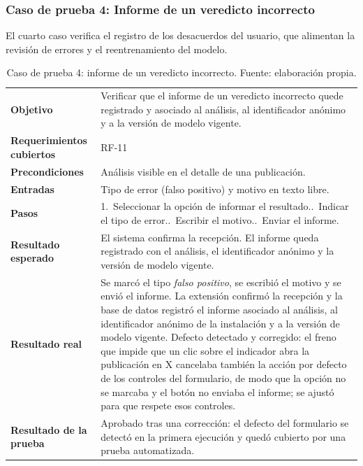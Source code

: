 \subsubsection{Caso de prueba 4: Informe de un veredicto incorrecto}

El cuarto caso verifica el registro de los desacuerdos del usuario, que alimentan la revisión de errores y el reentrenamiento del modelo.

\begin{small}
\begin{longtable}{@{}>{\raggedright\arraybackslash}p{3.4cm} p{11.8cm}@{}}
  \caption{Caso de prueba 4: informe de un veredicto incorrecto. Fuente: elaboración propia.}
  \label{tab:cp-04} \\
    \hline
    \textbf{Objetivo} & Verificar que el informe de un veredicto incorrecto quede registrado y asociado al análisis, al identificador anónimo y a la versión de modelo vigente. \\
    \textbf{Requerimientos cubiertos} & RF-11 \\
    \textbf{Precondiciones} & Análisis visible en el detalle de una publicación. \\
    \textbf{Entradas} & Tipo de error (falso positivo) y motivo en texto libre. \\
    \textbf{Pasos} & 1.~Seleccionar la opción de informar el resultado.\newline 2.~Indicar el tipo de error.\newline 3.~Escribir el motivo.\newline 4.~Enviar el informe. \\
    \textbf{Resultado esperado} & El sistema confirma la recepción. El informe queda registrado con el análisis, el identificador anónimo y la versión de modelo vigente. \\
    \textbf{Resultado real} & Se marcó el tipo \emph{falso positivo}, se escribió el motivo y se envió el informe. La extensión confirmó la recepción y la base de datos registró el informe asociado al análisis, al identificador anónimo de la instalación y a la versión de modelo vigente. Defecto detectado y corregido: el freno que impide que un clic sobre el indicador abra la publicación en X cancelaba también la acción por defecto de los controles del formulario, de modo que la opción no se marcaba y el botón no enviaba el informe; se ajustó para que respete esos controles. \\
    \textbf{Resultado de la prueba} & Aprobado tras una corrección: el defecto del formulario se detectó en la primera ejecución y quedó cubierto por una prueba automatizada. \\
    \hline
\end{longtable}
\end{small}

